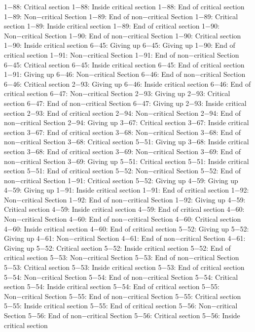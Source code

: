 1−88: Critical section
1−88: Inside critical section
1−88: End of critical section
1−89: Non−critical Section
1−89: End of non−critical Section
1−89: Critical section
1−89: Inside critical section
1−89: End of critical section
1−90: Non−critical Section
1−90: End of non−critical Section
1−90: Critical section
1−90: Inside critical section
6−45: Giving up
6−45: Giving up
1−90: End of critical section
1−91: Non−critical Section
1−91: End of non−critical Section
6−45: Critical section
6−45: Inside critical section
6−45: End of critical section
1−91: Giving up
6−46: Non−critical Section
6−46: End of non−critical Section
6−46: Critical section
2−93: Giving up
6−46: Inside critical section
6−46: End of critical section
6−47: Non−critical Section
2−93: Giving up
2−93: Critical section
6−47: End of non−critical Section
6−47: Giving up
2−93: Inside critical section
2−93: End of critical section
2−94: Non−critical Section
2−94: End of non−critical Section
2−94: Giving up
3−67: Critical section
3−67: Inside critical section
3−67: End of critical section
3−68: Non−critical Section
3−68: End of non−critical Section
3−68: Critical section
5−51: Giving up
3−68: Inside critical section
3−68: End of critical section
3−69: Non−critical Section
3−69: End of non−critical Section
3−69: Giving up
5−51: Critical section
5−51: Inside critical section
5−51: End of critical section
5−52: Non−critical Section
5−52: End of non−critical Section
1−91: Critical section
5−52: Giving up
4−59: Giving up
4−59: Giving up
1−91: Inside critical section
1−91: End of critical section
1−92: Non−critical Section
1−92: End of non−critical Section
1−92: Giving up
4−59: Critical section
4−59: Inside critical section
4−59: End of critical section
4−60: Non−critical Section
4−60: End of non−critical Section
4−60: Critical section
4−60: Inside critical section
4−60: End of critical section
5−52: Giving up
5−52: Giving up
4−61: Non−critical Section
4−61: End of non−critical Section
4−61: Giving up
5−52: Critical section
5−52: Inside critical section
5−52: End of critical section
5−53: Non−critical Section
5−53: End of non−critical Section
5−53: Critical section
5−53: Inside critical section
5−53: End of critical section
5−54: Non−critical Section
5−54: End of non−critical Section
5−54: Critical section
5−54: Inside critical section
5−54: End of critical section
5−55: Non−critical Section
5−55: End of non−critical Section
5−55: Critical section
5−55: Inside critical section
5−55: End of critical section
5−56: Non−critical Section
5−56: End of non−critical Section
5−56: Critical section
5−56: Inside critical section
